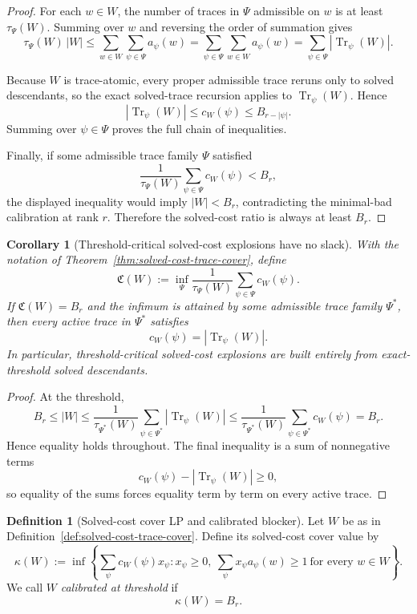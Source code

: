 \documentclass[11pt]{article}
\newtheorem{corollary}[theorem]{Corollary}
\theoremstyle{definition}
\newtheorem{definition}[theorem]{Definition}
\newcommand{\1}{\mathbf{1}}
\begin{document}
\begin{proof}
For each $w\in W$, the number of traces in $\Psi$ admissible on $w$ is at least $\tau_\Psi(W)$. Summing over $w$ and reversing the order of summation gives
\[
\tau_\Psi(W)\,|W|
\le
\sum_{w\in W}\sum_{\psi\in\Psi} a_\psi(w)
=
\sum_{\psi\in\Psi}\sum_{w\in W} a_\psi(w)
=
\sum_{\psi\in\Psi} |\operatorname{Tr}_\psi(W)|.
\]

Because $W$ is trace-atomic, every proper admissible trace reruns only to solved descendants, so the exact solved-trace recursion applies to $\operatorname{Tr}_\psi(W)$. Hence
\[
|\operatorname{Tr}_\psi(W)|\le c_W(\psi)\le B_{r-|\psi|}.
\]
Summing over $\psi\in \Psi$ proves the full chain of inequalities.

Finally, if some admissible trace family $\Psi$ satisfied
\[
\frac{1}{\tau_\Psi(W)}
\sum_{\psi\in\Psi} c_W(\psi)<B_r,
\]
the displayed inequality would imply $|W|<B_r$, contradicting the minimal-bad calibration at rank $r$. Therefore the solved-cost ratio is always at least $B_r$.
\end{proof}

\begin{corollary}[Threshold-critical solved-cost explosions have no slack]\label{cor:solved-cost-threshold}
With the notation of Theorem~\ref{thm:solved-cost-trace-cover}, define
\[
\mathfrak C(W):=
\inf_{\Psi}
\frac{1}{\tau_\Psi(W)}
\sum_{\psi\in\Psi} c_W(\psi).
\]
If $\mathfrak C(W)=B_r$ and the infimum is attained by some admissible trace family $\Psi^\ast$, then every active trace in $\Psi^\ast$ satisfies
\[
c_W(\psi)=|\operatorname{Tr}_\psi(W)|.
\]
In particular, threshold-critical solved-cost explosions are built entirely from exact-threshold solved descendants.
\end{corollary}

\begin{proof}
At the threshold,
\[
B_r\le |W|
\le
\frac{1}{\tau_{\Psi^\ast}(W)}
\sum_{\psi\in\Psi^\ast} |\operatorname{Tr}_\psi(W)|
\le
\frac{1}{\tau_{\Psi^\ast}(W)}
\sum_{\psi\in\Psi^\ast} c_W(\psi)
=
B_r.
\]
Hence equality holds throughout. The final inequality is a sum of nonnegative terms
\[
c_W(\psi)-|\operatorname{Tr}_\psi(W)|\ge 0,
\]
so equality of the sums forces equality term by term on every active trace.
\end{proof}

\begin{definition}[Solved-cost cover LP and calibrated blocker]\label{def:calibrated-blocker}
Let $W$ be as in Definition~\ref{def:solved-cost-trace-cover}. Define its solved-cost cover value by
\[
\kappa(W):=
\inf\left\{
\sum_{\psi} c_W(\psi)x_\psi:
x_\psi\ge 0,\ 
\sum_{\psi} x_\psi a_\psi(w)\ge 1\ \text{for every }w\in W
\right\}.
\]
We call $W$ \emph{calibrated at threshold} if
\[
\kappa(W)=B_r.
\]
\end{definition}
\end{document}
